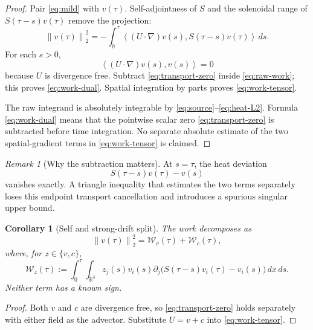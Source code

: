 \documentclass[11pt]{article}
\newtheorem{corollary}[theorem]{Corollary}
\theoremstyle{remark}
\newtheorem{remark}[theorem]{Remark}
\newcommand{\R}{\mathbb R}
\newcommand{\norm}[1]{\left\|#1\right\|}
\newcommand{\ip}[2]{\left\langle #1,#2\right\rangle}
\begin{document}
\begin{proof}
Pair \eqref{eq:mild} with \(v(\tau)\).  Self-adjointness of \(S\) and
the solenoidal range of \(S(\tau-s)v(\tau)\) remove the projection:
\begin{equation}
\label{eq:raw-work}
 \norm{v(\tau)}_2^2
 =
 -\int_0^\tau
 \ip{(U\cdot\nabla)v(s)}
 {S(\tau-s)v(\tau)}\,ds.
\end{equation}
For each \(s>0\),
\begin{equation}
\label{eq:transport-zero}
 \ip{(U\cdot\nabla)v(s)}{v(s)}=0
\end{equation}
because \(U\) is divergence free.  Subtract
\eqref{eq:transport-zero} inside \eqref{eq:raw-work}; this proves
\eqref{eq:work-dual}.  Spatial integration by parts proves
\eqref{eq:work-tensor}.

The raw integrand is absolutely integrable by
\eqref{eq:source}--\eqref{eq:heat-L2}.  Formula
\eqref{eq:work-dual} means that the pointwise scalar zero
\eqref{eq:transport-zero} is subtracted before time integration.  No
separate absolute estimate of the two spatial-gradient terms in
\eqref{eq:work-tensor} is claimed.
\end{proof}

\begin{remark}[Why the subtraction matters]
At \(s=\tau\), the heat deviation
\[
 S(\tau-s)v(\tau)-v(s)
\]
vanishes exactly.  A triangle inequality that estimates the two terms
separately loses this endpoint transport cancellation and introduces a
spurious singular upper bound.
\end{remark}

\begin{corollary}[Self and strong-drift split]
\label{cor:split}
The work decomposes as
\begin{equation}
\label{eq:split}
 \norm{v(\tau)}_2^2
 =
 \mathcal W_v(\tau)+\mathcal W_c(\tau),
\end{equation}
where, for \(z\in\{v,c\}\),
\begin{equation}
\label{eq:Wz}
 \mathcal W_z(\tau)
 :=
 \int_0^\tau\int_{\R^3}
 z_j(s)v_i(s)
 \partial_j\bigl(
 S(\tau-s)v_i(\tau)-v_i(s)
 \bigr)\,dx\,ds.
\end{equation}
Neither term has a known sign.
\end{corollary}

\begin{proof}
Both \(v\) and \(c\) are divergence free, so
\eqref{eq:transport-zero} holds separately with either field as the
advector.  Substitute \(U=v+c\) into \eqref{eq:work-tensor}.
\end{proof}
\end{document}
